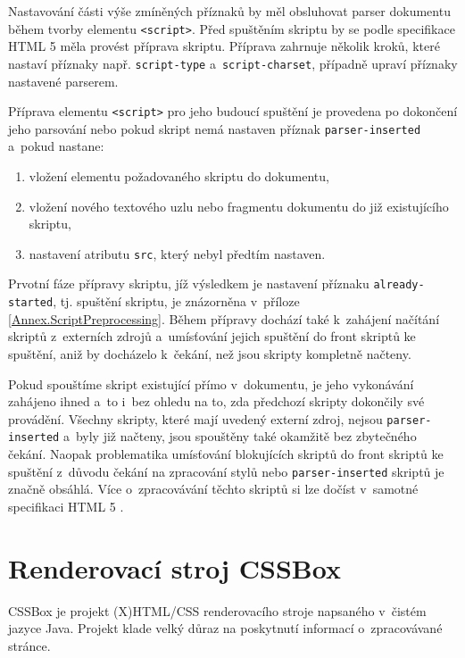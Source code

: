 Nastavování části výše zmíněných příznaků by měl obsluhovat parser dokumentu během tvorby elementu \texttt{<script>}. Před spuštěním skriptu by se podle specifikace HTML 5 měla provést příprava skriptu. Příprava zahrnuje několik kroků, které nastaví příznaky např. \texttt{script-type} a~\texttt{script-charset}, případně upraví příznaky nastavené parserem. 

Příprava elementu \texttt{<script>} pro jeho budoucí spuštění je provedena po dokončení jeho parsování nebo pokud skript nemá nastaven příznak \texttt{parser-inserted} a~pokud nastane:

\begin{enumerate}
  \item vložení elementu požadovaného skriptu do dokumentu,
  \item vložení nového textového uzlu nebo fragmentu dokumentu do již existujícího skriptu,
  \item nastavení atributu \texttt{src}, který nebyl předtím nastaven.
\end{enumerate}

Prvotní fáze přípravy skriptu, jíž výsledkem je nastavení příznaku \texttt{already-started}, tj. spuštění skriptu, je znázorněna v~příloze \ref{Annex.ScriptPreprocessing}. Během přípravy dochází také k~zahájení načítání skriptů z~externích zdrojů a~umísťování jejich spuštění do front skriptů ke spuštění, aniž by docházelo k~čekání, než jsou skripty kompletně načteny. 

Pokud spouštíme skript existující přímo v~dokumentu, je jeho vykonávání zahájeno ihned a~to i~bez ohledu na to, zda předchozí skripty dokončily své provádění. Všechny skripty, které mají uvedený externí zdroj, nejsou \texttt{parser-inserted} a~byly již načteny, jsou spouštěny také okamžitě bez zbytečného čekání. Naopak problematika umísťování blokujících skriptů do front skriptů ke spuštění z~důvodu čekání na zpracování stylů nebo \texttt{parser-inserted} skriptů je značně obsáhlá. Více o~zpracovávání těchto skriptů si lze dočíst v~samotné specifikaci HTML 5 \cite{Bibliography.HTML5.Scripting}.

\section{Renderovací stroj CSSBox}
\label{Chapter.DependenciesAnalysis.CSSBox}

CSSBox je projekt (X)HTML/CSS renderovacího stroje napsaného v~čistém jazyce Java. Projekt klade velký důraz na poskytnutí informací o~zpracovávané stránce.

